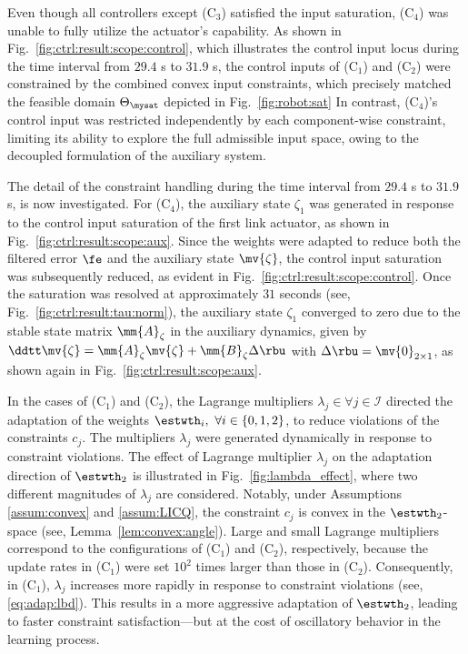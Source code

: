 \documentclass[journal]{IEEEtran}
\begin{document}
Even though all controllers except (C$_3$) satisfied the input saturation, (C$_4$) was unable to fully utilize the actuator's capability.
As shown in Fig.~\ref{fig:ctrl:result:scope:control}, which illustrates the control input locus during the time interval from $29.4$ s to $31.9$ s, the control inputs of (C$_1$) and (C$_2$) were constrained by the combined convex input constraints, which precisely matched the feasible domain $\Theta_{\mysat}$ depicted in Fig.~\ref{fig:robot:sat}
In contrast, (C$_4$)'s control input was restricted independently by each component-wise constraint, limiting its ability to explore the full admissible input space, owing to the decoupled formulation of the auxiliary system.

\hfill 

The detail of the constraint handling during the time interval from $29.4$ s to $31.9$ s, is now investigated.
For (C$_4$), the auxiliary state $\zeta_1$ was generated in response to the control input saturation of the first link actuator, as shown in Fig.~\ref{fig:ctrl:result:scope:aux}.
Since the weights were adapted to reduce both the filtered error $\fe$ and the auxiliary state $\mv{\zeta}$, the control input saturation was subsequently reduced, as evident in Fig.~\ref{fig:ctrl:result:scope:control}.
Once the saturation was resolved at approximately $31$ seconds (see, Fig.~\ref{fig:ctrl:result:tau:norm}), the auxiliary state $\zeta_1$ converged to zero due to the stable state matrix $\mm{A}_\zeta$ in the auxiliary dynamics, given by $\ddtt\mv{\zeta} = \mm{A}_\zeta \mv{\zeta} + \mm{B}_\zeta \Delta\rbu$ with $\Delta\rbu=\mv{0}_{2\times1}$, as shown again in Fig.~\ref{fig:ctrl:result:scope:aux}.

In the cases of (C$_1$) and (C$_2$), the Lagrange multipliers $\lambda_j\in\forall j\in\mathcal{I}$ directed the adaptation of the weights $\estwth_i,\ \forall i\in\{0,1,2\}$, to reduce violations of the constraints $c_j$. 
The multipliers $\lambda_j$ were generated dynamically in response to constraint violations.
The effect of Lagrange multiplier $\lambda_j$ on the adaptation direction of $\estwth_2$ is illustrated in Fig.~\ref{fig:lambda_effect}, where two different magnitudes of $\lambda_j$ are considered. 
Notably, under Assumptions \ref{assum:convex} and \ref{assum:LICQ}, the constraint $c_j$ is convex in the $\estwth_2$-space (see, Lemma~\ref{lem:convex:angle}).
Large and small Lagrange multipliers correspond to the configurations of (C$_1$) and (C$_2$), respectively, because the update rates in (C$_1$) were set $10^2$ times larger than those in (C$_2$).
Consequently, in (C$_1$), $\lambda_j$ increases more rapidly in response to constraint violations (see, \eqref{eq:adap:lbd}). 
This results in a more aggressive adaptation of $\estwth_2$, leading to faster constraint satisfaction—but at the cost of oscillatory behavior in the learning process.
\end{document}
